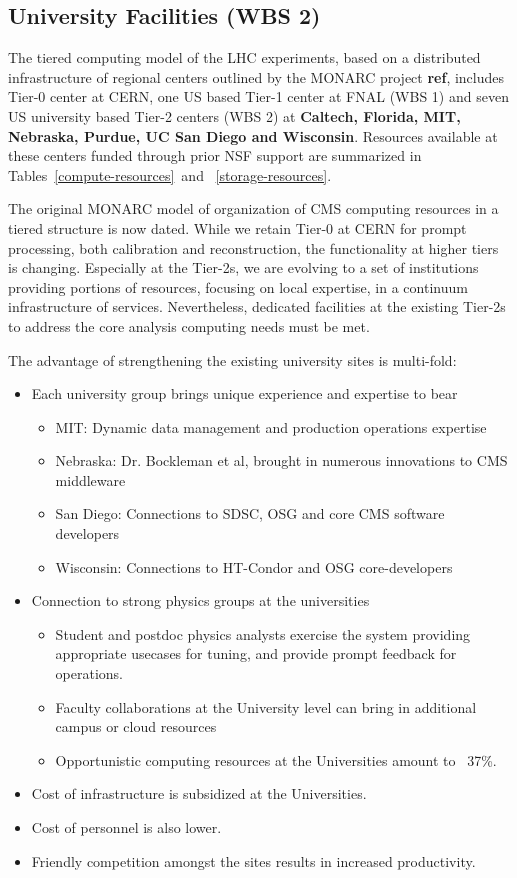 \documentclass[11pt,a4paper]{article}
\begin{document}
\subsection{University Facilities (WBS 2)}

The tiered computing model of the LHC experiments, based on a 
distributed infrastructure of regional centers outlined by
the MONARC project {\bf ref}, includes Tier-0 center at CERN,
one US based Tier-1 center at FNAL (WBS 1) and seven US 
university based Tier-2 centers (WBS 2) at 
{\bf Caltech, Florida, MIT, Nebraska, Purdue, UC San Diego and Wisconsin}.
Resources available at these centers funded through prior NSF
support are summarized in Tables~\ref{compute-resources}~and~
\ref{storage-resources}.

The original MONARC model of organization of CMS computing resources
in a tiered structure is now dated. While we retain Tier-0 at CERN for
prompt processing, both calibration and reconstruction, the
functionality at higher tiers is changing. Especially at the Tier-2s,
we are evolving to a set of institutions providing portions of
resources, focusing on local expertise, in a continuum infrastructure
of services. Nevertheless, dedicated facilities at the existing
Tier-2s to address the core analysis computing needs must be met.

The advantage of strengthening the existing university sites is multi-fold:
\begin{itemize}
\item Each university group brings unique experience and expertise to bear
\begin{itemize}
\item MIT: Dynamic data management and production operations expertise
\item Nebraska: Dr. Bockleman et al, brought in numerous innovations to CMS middleware
\item San Diego: Connections to SDSC, OSG and core CMS software developers
\item Wisconsin: Connections to HT-Condor and OSG core-developers
\end{itemize}
\item Connection to strong physics groups at the universities
\begin{itemize}
\item Student and postdoc physics analysts exercise the system providing
appropriate usecases for tuning, and provide prompt feedback for operations.
\item Faculty collaborations at the University level can bring in additional
campus or cloud resources
\item Opportunistic computing resources at the Universities amount to ~37\%.
\end{itemize}
\item Cost of infrastructure is subsidized at the Universities.
\item Cost of personnel is also lower.
\item Friendly competition amongst the sites results in increased productivity.
\end{itemize}
\end{document}
